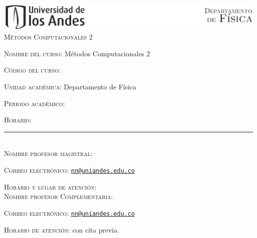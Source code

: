 \documentclass[letterpaper,10pt,onecolumn]{article}
\begin{document}
\begin{center}

\includegraphics[width=490pt]{header.png}\\[0.5cm]

\textsc{\LARGE M\'etodos Computacionales 2}\\[0.1cm]

\end{center}

\large \noindent\textsc{Nombre del curso:}  M\'etodos Computacionales 2 %
  
\noindent\textsc{C\'odigo del curso:}  %

\noindent\textsc{Unidad acad\'emica:} Departamento de F\'isica

\noindent\textsc{Periodo acad\'emico:} %

\noindent\textsc{Horario:}

\noindent\rule{\textwidth}{1pt}\\[-0.3cm]

\normalsize \noindent\textsc{Nombre profesor magistral:}

\noindent\textsc{Correo electr\'onico:}
\href{mailto:nn@uniandes.edu.co}{\nolinkurl{nn@uniandes.edu.co}}

\noindent\textsc{Horario y lugar de atenci\'on:} 
\\[-0.1cm]




\normalsize \noindent\textsc{Nombre profesor Complementaria:}

\noindent\textsc{Correo electr\'onico:}
\href{mailto:nn@uniandes.edu.co}{\nolinkurl{nn@uniandes.edu.co}}

\noindent\textsc{Horario de atenci\'on:} con cita previa. 
\\[-0.1cm]

\end{document}
